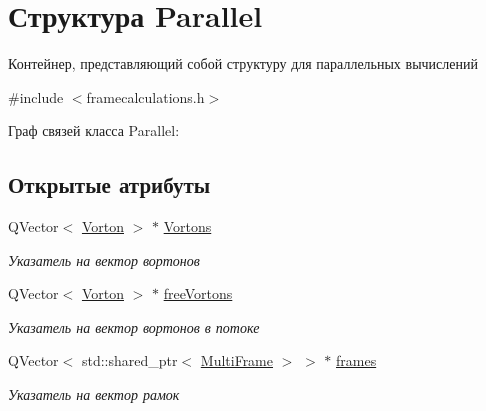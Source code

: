 \hypertarget{struct_parallel}{}\section{Структура Parallel}
\label{struct_parallel}


Контейнер, представляющий собой структуру для параллельных вычислений  




{\ttfamily \#include $<$framecalculations.\+h$>$}



Граф связей класса Parallel\+:
\subsection*{Открытые атрибуты}
\begin{DoxyCompactItemize}
\item 
\mbox{\label{struct_parallel_a2da6b701237c06bc0b3710843a9c6506}} 
Q\+Vector$<$ \mbox{\hyperlink{class_vorton}{Vorton}} $>$ $\ast$ \mbox{\hyperlink{struct_parallel_a2da6b701237c06bc0b3710843a9c6506}{Vortons}}
\begin{DoxyCompactList}\small\item\em Указатель на вектор вортонов \end{DoxyCompactList}\item 
\mbox{\label{struct_parallel_a6d8a25edea2e7f6f38f665152007306b}} 
Q\+Vector$<$ \mbox{\hyperlink{class_vorton}{Vorton}} $>$ $\ast$ \mbox{\hyperlink{struct_parallel_a6d8a25edea2e7f6f38f665152007306b}{free\+Vortons}}
\begin{DoxyCompactList}\small\item\em Указатель на вектор вортонов в потоке \end{DoxyCompactList}\item 
\mbox{\label{struct_parallel_aa0b4aef398478a70836363944df7253d}} 
Q\+Vector$<$ std\+::shared\+\_\+ptr$<$ \mbox{\hyperlink{class_multi_frame}{Multi\+Frame}} $>$ $>$ $\ast$ \mbox{\hyperlink{struct_parallel_aa0b4aef398478a70836363944df7253d}{frames}}
\begin{DoxyCompactList}\small\item\em Указатель на вектор рамок \end{DoxyCompactList}\item 
\mbox{\label{struct_parallel_a03856e8f10a990c5170ba56936c05f29}} 

\end{DoxyCompactItemize}
